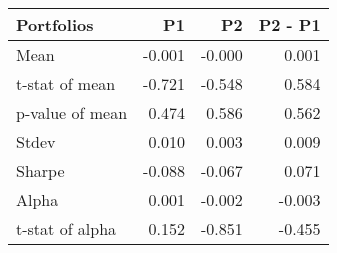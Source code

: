 \begin{tabular}{lrrr}
\toprule
Portfolios & P1 & P2 & P2 - P1 \\
\midrule
Mean & -0.001 & -0.000 & 0.001 \\
t-stat of mean & -0.721 & -0.548 & 0.584 \\
p-value of mean & 0.474 & 0.586 & 0.562 \\
Stdev & 0.010 & 0.003 & 0.009 \\
Sharpe & -0.088 & -0.067 & 0.071 \\
Alpha & 0.001 & -0.002 & -0.003 \\
t-stat of alpha & 0.152 & -0.851 & -0.455 \\
\bottomrule
\end{tabular}
